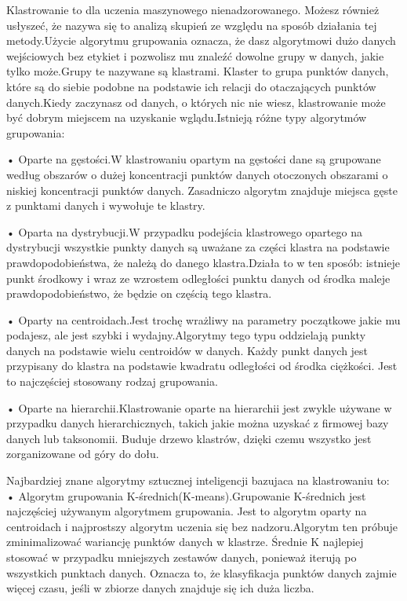   Klastrowanie to dla uczenia maszynowego nienadzorowanego. Możesz również usłyszeć, że nazywa się to analizą skupień ze względu na sposób działania tej metody.Użycie algorytmu grupowania oznacza, że dasz algorytmowi dużo danych wejściowych bez etykiet i pozwolisz mu znaleźć dowolne grupy w danych, jakie tylko może.Grupy te nazywane są klastrami. Klaster to grupa punktów danych, które są do siebie podobne na podstawie ich relacji do otaczających punktów danych.Kiedy zaczynasz od danych, o których nic nie wiesz, klastrowanie może być dobrym miejscem na uzyskanie wglądu.Istnieją różne typy algorytmów grupowania:
  
 •  Oparte na gęstości.W klastrowaniu opartym na gęstości dane są grupowane według obszarów o dużej koncentracji punktów danych otoczonych obszarami o niskiej koncentracji punktów danych. Zasadniczo algorytm znajduje miejsca gęste z punktami danych i wywołuje te klastry.

 •  Oparta na dystrybucji.W przypadku podejścia klastrowego opartego na dystrybucji wszystkie punkty danych są uważane za części klastra na podstawie prawdopodobieństwa, że należą do danego klastra.Działa to w ten sposób: istnieje punkt środkowy i wraz ze wzrostem odległości punktu danych od środka maleje prawdopodobieństwo, że będzie on częścią tego klastra.

  •  Oparty na centroidach.Jest trochę wrażliwy na parametry początkowe jakie mu podajesz, ale jest szybki i wydajny.Algorytmy tego typu oddzielają punkty danych na podstawie wielu centroidów w danych. Każdy punkt danych jest przypisany do klastra na podstawie kwadratu odległości od środka ciężkości. Jest to najczęściej stosowany rodzaj grupowania.
  
  •  Oparte na hierarchii.Klastrowanie oparte na hierarchii jest zwykle używane w przypadku danych hierarchicznych, takich jakie można uzyskać z firmowej bazy danych lub taksonomii. Buduje drzewo klastrów, dzięki czemu wszystko jest zorganizowane od góry do dołu.\cite{clust2020}

Najbardziej znane algorytmy sztucznej inteligencji bazujaca na klastrowaniu to:
  • Algorytm grupowania K-średnich(K-means).Grupowanie K-średnich jest najczęściej używanym algorytmem grupowania. Jest to algorytm oparty na centroidach i najprostszy algorytm uczenia się bez nadzoru.Algorytm ten próbuje zminimalizować wariancję punktów danych w klastrze. Średnie K najlepiej stosować w przypadku mniejszych zestawów danych, ponieważ iterują po wszystkich punktach danych. Oznacza to, że klasyfikacja punktów danych zajmie więcej czasu, jeśli w zbiorze danych znajduje się ich duża liczba.\cite{clust2020}


